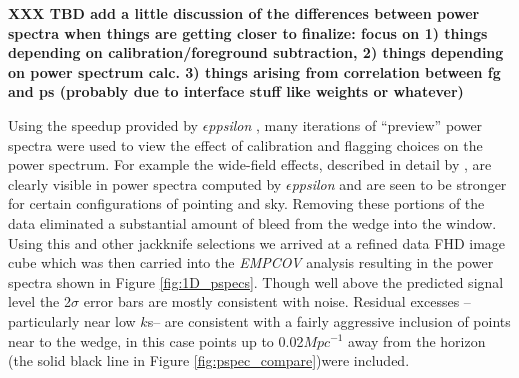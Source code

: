 \documentclass[preprint]{aastex}
\def\eppsilon{{\it $\epsilon$ppsilon }}
\def\empirical cov{\emph{EMPCOV }}
\begin{document}
{\bf XXX TBD add a little discussion of the differences between power spectra when things are getting closer to finalize: focus on 1) things depending on calibration/foreground subtraction, 2) things depending on power spectrum calc.  3) things arising from correlation between fg and ps (probably due to interface stuff like weights or whatever)}


Using the speedup provided by \eppsilon, many iterations of ``preview'' power spectra were used to view the effect of calibration and flagging choices on the power spectrum. For example the wide-field effects, described in detail by \cite{2015arXiv150207596T}, are clearly visible in power spectra computed by \eppsilon and are seen to be stronger for certain configurations of pointing and sky. Removing these portions of the data eliminated a substantial amount of bleed from the wedge into the window.  Using this and other jackknife selections we arrived at a refined data FHD image cube which was then carried into the \empirical cov analysis resulting in the power spectra shown in Figure \ref{fig:1D_pspecs}.   Though well above the predicted signal level the 2$\sigma$ error bars are mostly consistent with noise.   Residual excesses --particularly near low $k$s--  are consistent with a fairly aggressive inclusion of points near to the wedge, in this case points up to 0.02$Mpc^{-1}$ away from the horizon (the solid black line in Figure \ref{fig:pspec_compare})were included.
\end{document}
